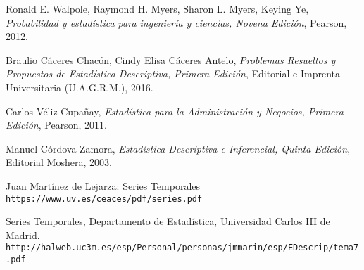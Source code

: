 

\begin{thebibliography}{9}
Ronald E. Walpole, Raymond H. Myers, Sharon L. Myers, Keying Ye, \textit{Probabilidad y estadística para ingeniería y ciencias, Novena Edición}, Pearson, 2012. 
 
Braulio Cáceres Chacón, Cindy Elisa Cáceres Antelo, \textit{Problemas Resueltos y Propuestos de Estadística Descriptiva, Primera Edición}, Editorial e Imprenta Universitaria (U.A.G.R.M.), 2016.

Carlos Véliz Cupañay, \textit{Estadística para la Administración y Negocios, Primera Edición}, Pearson, 2011. 

Manuel Córdova Zamora, \textit{Estadística Descriptiva e Inferencial, Quinta Edición}, Editorial Moshera, 2003. 
 
 
Juan Martínez de Lejarza: Series Temporales
\\\texttt{https://www.uv.es/ceaces/pdf/series.pdf}

Series Temporales, Departamento de Estadística, Universidad Carlos III de Madrid.
\\\texttt{http://halweb.uc3m.es/esp/Personal/personas/jmmarin/esp/EDescrip/tema7.pdf}




\end{thebibliography}

